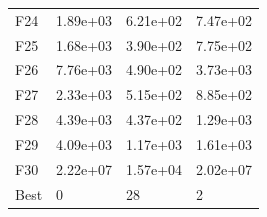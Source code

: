 \begin{table}[H]
\begin{minipage}{.5\linewidth}
\begin{tabular}{llll}
            F24  &  1.89e+03 &  6.21e+02 &  7.47e+02 \\
            F25  &  1.68e+03 &  3.90e+02 &  7.75e+02 \\
            F26  &  7.76e+03 &  4.90e+02 &  3.73e+03 \\
            F27  &  2.33e+03 &  5.15e+02 &  8.85e+02 \\
            F28  &  4.39e+03 &  4.37e+02 &  1.29e+03 \\
            F29  &  4.09e+03 &  1.17e+03 &  1.61e+03 \\
            F30  &  2.22e+07 &  1.57e+04 &  2.02e+07 \\
            Best &         0 &        28 &         2 \\
            \bottomrule
            \end{tabular}
            
    \end{minipage} 
\end{table}

